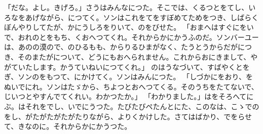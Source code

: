 \documentclass[a4paper,
tate,
book]
{jlreq}
\begin{document}
「だな。よし。きげろ。」さうはみんなにつた。そこでは、くるつとをてし、いろなをあげながら、につてく。ソンはこれをてをすぼめてためをつき、しばらくぼんやりしてたが、かにうしろをりいて、のをびせた。
「おまへはすぐにをいで、おれのとをもち、くおへつてくれ。それからかにかうふのだ。ソンバーユーは、あのの漠ので、のひるもも、からりるひまがなく、たうとうからだがにつき、そのまたがについて、どうにもおへられません。これからおにきまして、やがていたします。かうていねいにつてくれ。」
  のはうなづいて、すばやくとをぎ、ソンのをもつて、にかけてく。ソンはみんにつた。
「しづかにをおり、をぬいでにれ。ソンはたゞから、ちよつとおへつてくる。そのうちをたてないで、じいつとやすんでてくれい。わかつたか。」
「わかりました。」はをそろへてにぶ。はそれをでし、いでにうつた。たびたびペたんとにた、このなは、こゝでのをし、がたがたがたがたりながら、よりくかけした。さてはばかり、でをらせて、きなのに。それからかにかうつた。
\end{document}
